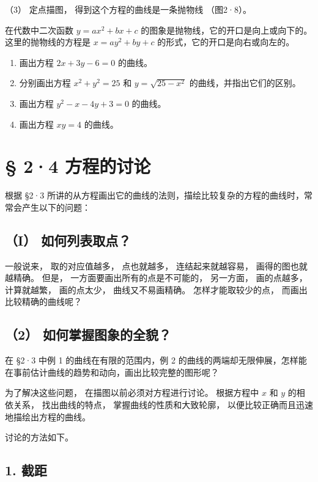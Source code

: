 （3） 定点描图， 得到这个方程的曲线是一条抛物线 （图2·8）。

在代数中二次函数 \(y = ax^2 + bx + c\)
的图象是抛物线，它的开口是向上或向下的。这里的抛物线的方程是
\(x = ay^2 + by + c\) 的形式，它的开口是向右或向左的。

\begin{enumerate}
\def\labelenumi{\arabic{enumi}.}
\item
  画出方程 \(2x + 3y - 6 = 0\) 的曲线。
\item
  分别画出方程 \(x^{2} + y^{2} = 25\) 和 \(y = \sqrt{25 - x^{2}}\)
  的曲线，并指出它们的区别。
\item
  画出方程 \(y^{2} - x - 4y + 3 = 0\) 的曲线。
\item
  画出方程 \(xy = 4\) 的曲线。
\end{enumerate}

\section{§ 2·4 方程的讨论}\label{ux65b9ux7a0bux7684ux8ba8ux8bba}

根据 §2·3
所讲的从方程画出它的曲线的法则，描绘比较复杂的方程的曲线时，常常会产生以下的问题：

\subsection{（I）
如何列表取点？}\label{i-ux5982ux4f55ux5217ux8868ux53d6ux70b9}

一般说来， 取的对应值越多， 点也就越多， 连结起来就越容易，
画得的图也就越精确。 但是， 一方面要画出所有的点是不可能的， 另一方面，
画的点越多， 计算就越繁， 画的点太少， 曲线又不易画精确。
怎样才能取较少的点， 而画出比较精确的曲线呢？

\subsection{（2）
如何掌握图象的全貌？}\label{ux5982ux4f55ux638cux63e1ux56feux8c61ux7684ux5168ux8c8c}

在 §2·3 中例 1 的曲线在有限的范围内，例 2
的曲线的两端却无限伸展，怎样能在事前估计曲线的趋势和动向，画出比较完整的图形呢？

为了解决这些问题， 在描图以前必须对方程进行讨论。 根据方程中 \(x\) 和
\(y\) 的相依关系， 找出曲线的特点， 掌握曲线的性质和大致轮廓，
以便比较正确而且迅速地描绘出方程的曲线。

讨论的方法如下。

\subsection{1. 截距}\label{ux622aux8ddd}


